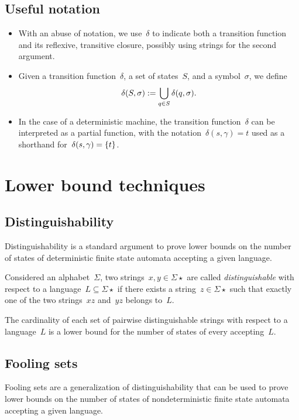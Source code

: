 \subsection{Useful notation}
\begin{itemize}
	\item With an abuse of notation, we use~$\delta$ to indicate both a transition function and its reflexive, transitive closure, possibly using strings for the second argument.
	\item Given a transition function~$\delta$, a set of states~$S$, and a symbol~$\sigma$, we define
	      \begin{equation*}
		      \delta(S,\sigma):=\bigcup_{q\in S} \delta(q,\sigma) \text.
	      \end{equation*}
	\item In the case of a deterministic machine, the transition function~$\delta$ can be interpreted as a partial function, with the notation~$\delta(s,\gamma)=t$ used as a shorthand for~$\delta(s,\gamma)=\{t\}$.
\end{itemize}



\section{Lower bound techniques}


\subsection{Distinguishability}\label{sub:distinguishability}
Distinguishability is a standard argument to prove lower bounds on the number of states of deterministic finite state automata accepting a given language.
\begin{defn}
	Considered an alphabet~$\Sigma$, two strings~$x,y\in\Sigma\star$ are called \emph{distinguishable} with respect to a language~$L\subseteq\Sigma\star$ if there exists a string~$z\in\Sigma\star$ such that exactly one of the two strings~$xz$ and~$yz$ belongs to~$L$.
\end{defn}
\begin{thrm}
	The cardinality of each set of pairwise distinguishable strings with respect to a language~$L$ is a lower bound for the number of states of every \ODFA accepting~$L$.
\end{thrm}


\subsection{Fooling sets}\label{sub:foolingsets}
Fooling sets are a generalization of distinguishability that can be used to prove lower bounds on the number of states of nondeterministic finite state automata accepting a given language.

